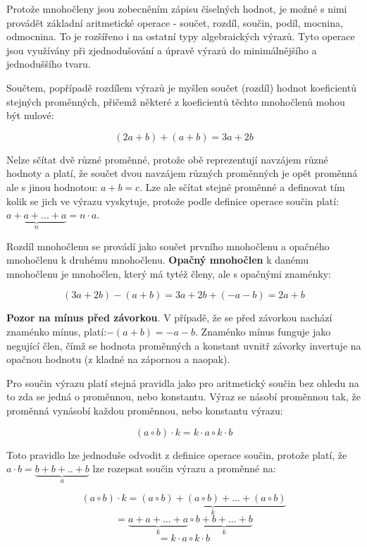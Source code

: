 
Protože mnohočleny jsou zobecněním zápisu číselných hodnot, je možné s nimi provádět základní aritmetické operace - součet, rozdíl, součin, podíl, mocnina, odmocnina. To je rozšířeno i na ostatní typy algebraických výrazů. Tyto operace jsou využívány při zjednodušování a úpravě výrazů do minimálnějšího a jednoduššího tvaru.


Součtem, popřípadě rozdílem výrazů je myšlen součet (rozdíl) hodnot koeficientů stejných proměnných, přičemž některé z koeficientů těchto mnohočlenů mohou být nulové:

$$ (2a+b) + (a+b) = 3a + 2b $$

Nelze sčítat dvě různé proměnné, protože obě reprezentují navzájem různé hodnoty a platí, že součet dvou navzájem různých proměnných je opět proměnná ale s jinou hodnotou: $a+b=c$. Lze ale sčítat stejné proměnné a definovat tím kolik se jich ve výrazu vyskytuje, protože podle definice operace součin platí: $\underbrace{a+a+...+a}_n=n\cdot a$.

Rozdíl mnohočlenu se provádí jako součet prvního mnohočlenu a opačného mnohočlenu k druhému mnohočlenu. {\bf Opačný mnohočlen} k danému mnohočlenu je mnohočlen, který má tytéž členy, ale s opačnými znaménky:

$$ (3a+2b) - (a+b) = 3a + 2b + (-a -b) =  2a + b $$

{\bf Pozor na mínus před závorkou}. V případě, že se před závorkou nachází znaménko mínus, platí:$-(a+b)=-a-b$. Znaménko mínus funguje jako negující člen, čímž se hodnota proměnných a konstant uvnitř závorky invertuje na opačnou hodnotu (z kladné na zápornou a naopak).


Pro součin výrazu platí stejná pravidla jako pro aritmetický součin bez ohledu na to zda se jedná o proměnnou, nebo konstantu. Výraz se násobí proměnnou tak, že proměnná vynásobí každou proměnnou, nebo konstantu výrazu:

$$ (a \circ b) \cdot k = k\cdot a \circ k \cdot b  $$

Toto pravidlo lze jednoduše odvodit z definice operace součin, protože platí, že $a \cdot b = \underbrace{b + b +.. +b}_a$ lze rozepsat součin výrazu a proměnné na:

$$ (a \circ b ) \cdot k = \underbrace{(a \circ b ) + (a \circ b ) +...+ (a \circ b )}_k$$
$$=\underbrace{a + a + ... +a}_k \circ \underbrace{b + b +...+b}_k$$
$$ = k\cdot a \circ k\cdot b $$

